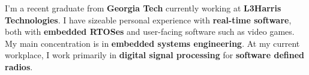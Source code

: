 I'm a recent graduate from \textbf{Georgia Tech} currently working at \textbf{L3Harris Technologies}.
I have sizeable personal experience with \textbf{real-time software},
both with \textbf{embedded RTOSes} and user-facing software such as video games.
My main concentration is in \textbf{embedded systems engineering}.
At my current workplace, I work primarily in \textbf{digital signal processing} for \textbf{software defined radios}.
